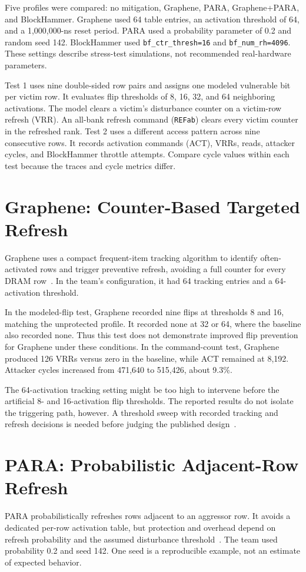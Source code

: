 \documentclass[11pt,letterpaper]{article}
\begin{document}
Five profiles were compared: no mitigation, Graphene, PARA, Graphene+PARA, and BlockHammer. Graphene used 64 table entries, an activation threshold of 64, and a 1,000,000-ns reset period. PARA used a probability parameter of 0.2 and random seed 142. BlockHammer used \texttt{bf\_ctr\_thresh=16} and \texttt{bf\_num\_rh=4096}. These settings describe stress-test simulations, not recommended real-hardware parameters.

Test 1 uses nine double-sided row pairs and assigns one modeled vulnerable bit per victim row. It evaluates flip thresholds of 8, 16, 32, and 64 neighboring activations. The model clears a victim's disturbance counter on a victim-row refresh (VRR). An all-bank refresh command (\texttt{REFab}) clears every victim counter in the refreshed rank. Test 2 uses a different access pattern across nine consecutive rows. It records activation commands (ACT), VRRs, reads, attacker cycles, and BlockHammer throttle attempts. Compare cycle values within each test because the traces and cycle metrics differ.

\section{Graphene: Counter-Based Targeted Refresh}
Graphene uses a compact frequent-item tracking algorithm to identify often-activated rows and trigger preventive refresh, avoiding a full counter for every DRAM row~\cite{graphene2020}. In the team's configuration, it had 64 tracking entries and a 64-activation threshold.

In the modeled-flip test, Graphene recorded nine flips at thresholds 8 and 16, matching the unprotected profile. It recorded none at 32 or 64, where the baseline also recorded none. Thus this test does not demonstrate improved flip prevention for Graphene under these conditions. In the command-count test, Graphene produced 126 VRRs versus zero in the baseline, while ACT remained at 8,192. Attacker cycles increased from 471,640 to 515,426, about 9.3\%.

The 64-activation tracking setting might be too high to intervene before the artificial 8- and 16-activation flip thresholds. The reported results do not isolate the triggering path, however. A threshold sweep with recorded tracking and refresh decisions is needed before judging the published design~\cite{graphene2020}.

\section{PARA: Probabilistic Adjacent-Row Refresh}
PARA probabilistically refreshes rows adjacent to an aggressor row. It avoids a dedicated per-row activation table, but protection and overhead depend on refresh probability and the assumed disturbance threshold~\cite{kim2014}. The team used probability 0.2 and seed 142. One seed is a reproducible example, not an estimate of expected behavior.
\end{document}
